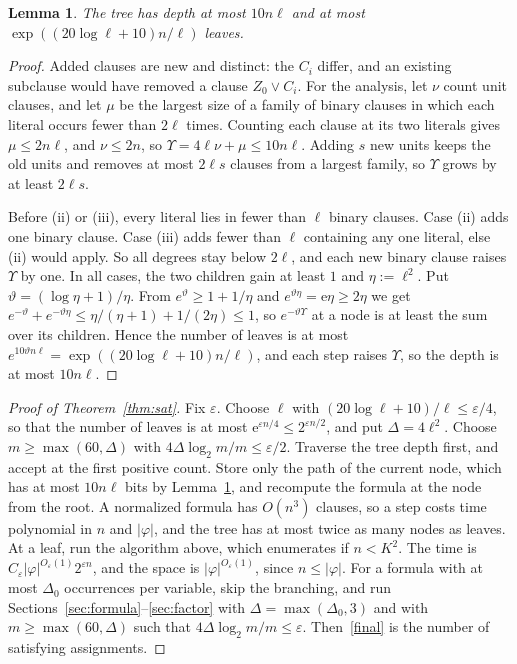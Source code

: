 \documentclass[11pt]{article}
\numberwithin{equation}{section}
\newtheorem{lemma}[theorem]{Lemma}
\theoremstyle{remark}
\begin{document}
\begin{lemma}\label{lem:tree}
The tree has depth at most $10n\ell$ and at most $\exp((20\log\ell+10)n/\ell)$ leaves.
\end{lemma}
\begin{proof}
Added clauses are new and distinct: the $C_i$ differ, and an existing subclause would have removed a clause $Z_0\vee C_i$. For the analysis, let $\nu$ count unit clauses, and let $\mu$ be the largest size of a family of binary clauses in which each literal occurs fewer than $2\ell$ times. Counting each clause at its two literals gives $\mu\le2n\ell$, and $\nu\le2n$, so $\Upsilon=4\ell\nu+\mu\le10n\ell$. Adding $s$ new units keeps the old units and removes at most $2\ell s$ clauses from a largest family, so $\Upsilon$ grows by at least $2\ell s$.

Before (ii) or (iii), every literal lies in fewer than $\ell$ binary clauses. Case (ii) adds one binary clause. Case (iii) adds fewer than $\ell$ containing any one literal, else (ii) would apply. So all degrees stay below $2\ell$, and each new binary clause raises $\Upsilon$ by one. In all cases, the two children gain at least $1$ and $\eta:=\ell^2$. Put $\vartheta=(\log\eta+1)/\eta$. From $e^\vartheta\ge1+1/\eta$ and $e^{\vartheta\eta}=\mathrm e\eta\ge2\eta$ we get $e^{-\vartheta}+e^{-\vartheta\eta}\le\eta/(\eta+1)+1/(2\eta)\le1$, so $e^{-\vartheta\Upsilon}$ at a node is at least the sum over its children. Hence the number of leaves is at most $e^{10\vartheta n\ell}=\exp((20\log\ell+10)n/\ell)$, and each step raises $\Upsilon$, so the depth is at most $10n\ell$.
\end{proof}



\begin{proof}[Proof of Theorem~\ref{thm:sat}]
Fix $\varepsilon$. Choose $\ell$ with $(20\log\ell+10)/\ell\le\varepsilon/4$, so that the number of leaves is at most $\mathrm e^{\varepsilon n/4}\le2^{\varepsilon n/2}$, and put $\Delta=4\ell^2$. Choose $m\ge\max(60,\Delta)$ with $4\Delta\log_2m/m\le\varepsilon/2$. Traverse the tree depth first, and accept at the first positive count. Store only the path of the current node, which has at most $10n\ell$ bits by Lemma~\ref{lem:tree}, and recompute the formula at the node from the root. A normalized formula has $O(n^3)$ clauses, so a step costs time polynomial in $n$ and $|\varphi|$, and the tree has at most twice as many nodes as leaves. At a leaf, run the algorithm above, which enumerates if $n<K^2$. The time is $C_\varepsilon|\varphi|^{O_\varepsilon(1)}2^{\varepsilon n}$, and the space is $|\varphi|^{O_\varepsilon(1)}$, since $n\le|\varphi|$. For a formula with at most $\Delta_0$ occurrences per variable, skip the branching, and run Sections~\ref{sec:formula}--\ref{sec:factor} with $\Delta=\max(\Delta_0,3)$ and with $m\ge\max(60,\Delta)$ such that $4\Delta\log_2m/m\le\varepsilon$. Then~\eqref{final} is the number of satisfying assignments.
\end{proof}
\end{document}
